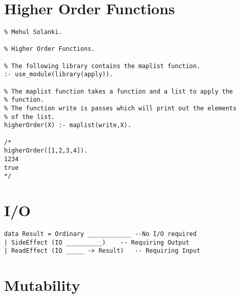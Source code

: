 \documentclass[thesis-solanki.tex]{subfiles}
\begin{document}


\section{Higher Order Functions}

\begin{verbatim}
% Mehul Solanki.

% Higher Order Functions.

% The following library contains the maplist function.
:- use_module(library(apply)).

% The maplist function takes a function and a list to apply the 
% function.
% The function write is passes which will print out the elements 
% of the list.
higherOrder(X) :- maplist(write,X).

/*
higherOrder([1,2,3,4]).
1234
true
*/
\end{verbatim}




\section{I/O}

\begin{verbatim}
data Result = Ordinary ____________ --No I/O required
| SideEffect (IO __________) 	-- Requiring Output
| ReadEffect (IO _____ -> Result) 	-- Requiring Input	

\end{verbatim}




\section{Mutability}
\end{document}
